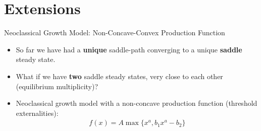 \documentclass[aspectratio=169,10pt]{beamer}
\newcommand{\emphcolor}[1]{\textbf{\textcolor{emphcolorval}{#1}}}
\begin{document}
\section{Extensions}

\begin{frame}{Neoclassical Growth Model: Non-Concave-Convex Production Function}
	\begin{itemize}
		\item So far we have had a \emphcolor{unique} saddle-path converging to a unique \emphcolor{saddle} steady state.
		\vspace{0.1in}
		\item What if we have \emphcolor{two} saddle steady states, very close to each other (equilibrium multiplicity)?
		\vspace{0.1in}
		\item Neoclassical growth model with a non-concave production function (threshold externalities):
		\begin{align*}
			f(x) = A \max\{x^a, b_1x^a - b_2\}
		\end{align*}
	\end{itemize}
\end{frame}
\end{document}
